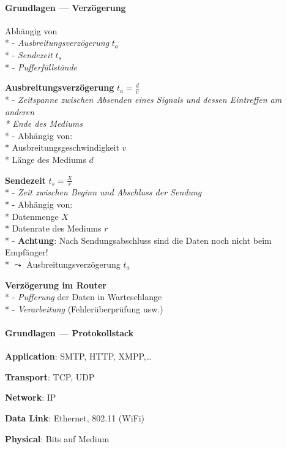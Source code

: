 \paragraph{Grundlagen --- Verzögerung}
\begin{items}
  \item Abhängig von \\*
    - \emph{Ausbreitungsverzögerung} \( t_a \) \\*
    - \emph{Sendezeit} \( t_s \) \\*
    - \emph{Pufferfüllstände}
  \item \textbf{Ausbreitungsverzögerung} \( t_a = \tfrac{d}{v} \) \\*
    - \emph{Zeitspanne zwischen Absenden eines Signals und dessen Eintreffen am anderen \\* \phantom{-} Ende des Mediums} \\*
    - Abhängig von: \\* 
      \phantom{-} Ausbreitungsgeschwindigkeit \( v \) \\*
      \phantom{-} Länge des Mediums \( d \)
  \item \textbf{Sendezeit} \( t_s = \tfrac{X}{r} \) \\*
    - \emph{Zeit zwischen Beginn und Abschluss der Sendung} \\*
    - Abhängig von: \\*
      \phantom{-} Datenmenge \( X \) \\*
      \phantom{-} Datenrate des Mediums \( r \) \\*
    - \textbf{Achtung}: Nach Sendungsabschluss sind die Daten noch nicht beim Empfänger! \\* \phantom{-} \( \leadsto \) Ausbreitungsverzögerung \( t_a \)
  \item \textbf{Verzögerung im Router} \\*
    - \emph{Pufferung} der Daten in Warteschlange \\*
    - \emph{Verarbeitung} (Fehlerüberprüfung usw.)
\end{items}

\paragraph{Grundlagen --- Protokollstack}
\begin{items}
  \item \textbf{Application}: SMTP, HTTP, XMPP,\dots
  \item \textbf{Transport}: TCP, UDP
  \item \textbf{Network}: IP
  \item \textbf{Data Link}: Ethernet, 802.11 (WiFi)
  \item \textbf{Physical}: Bits auf Medium
\end{items}

